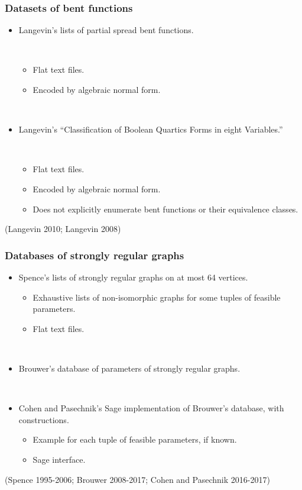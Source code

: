 \documentclass[pdf,sprung,slideColor,nocolorBG]{beamer}
\newenvironment{colortheme}[1]{
\def\ProvidesPackageRCS $##1${\relax}
\renewcommand{\ProcessOptions}{\relax}
\makeatletter

\makeatother
}{}
\newcommand{\slidecite}[1]{\tiny{(#1)}\normalsize{}}
\begin{document}
\begin{colortheme}{jubata}

\begin{frame}
\frametitle{Datasets of bent functions}
\begin{itemize}
 \item
Langevin's lists of partial spread bent functions.

~

 \begin{itemize}
  \item
Flat text files.
  \item
Encoded by algebraic normal form.
 \end{itemize}

~

 \item
Langevin's ``Classification of Boolean Quartics Forms in eight Variables.''

~

 \begin{itemize}
  \item
Flat text files.
  \item
Encoded by algebraic normal form.
  \item
Does not explicitly enumerate bent functions or their equivalence classes.
 \end{itemize}

\end{itemize}

\slidecite{Langevin 2010; Langevin 2008}
\end{frame}

\begin{frame}
\frametitle{Databases of strongly regular graphs}
\begin{itemize}
 \item
Spence's lists of strongly regular graphs on at most 64 vertices.
 \begin{itemize}
  \item
Exhaustive lists of non-isomorphic graphs for some tuples of feasible parameters.
  \item
Flat text files.
 \end{itemize}

~

 \item
Brouwer's database of parameters of strongly regular graphs.

~

 \item
Cohen and Pasechnik's Sage implementation of Brouwer's database, with constructions.
 \begin{itemize}
  \item
Example for each tuple of feasible parameters, if known.
  \item
Sage interface.
 \end{itemize}
\end{itemize}
\slidecite{Spence 1995-2006; Brouwer 2008-2017; Cohen and Pasechnik 2016-2017}
\end{frame}


\end{colortheme}
\end{document}
